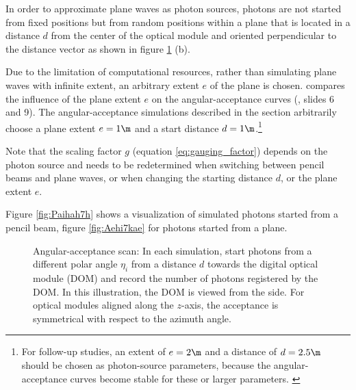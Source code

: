 In order to approximate plane waves as photon sources, photons are not started from fixed positions but from random positions within a plane that is located in a distance $d$ from the center of the optical module and oriented perpendicular to the distance vector as shown in figure \ref{fig:quie8Oof} (b).

Due to the limitation of computational resources, rather than simulating plane waves with infinite extent, an arbitrary extent $e$ of the plane is chosen. \rongen \cite{martindardupdate,rongenswedishcamera} compares the influence of the plane extent $e$ on the angular-acceptance curves (\cite{martindardupdate}, slides 6 and 9). The angular-acceptance simulations described in the section arbitrarily choose a plane extent $e = 1\m$ and a start distance $d = 1\m$.\footnote{For follow-up studies, an extent of $e=2\m$ and a distance of $d=2.5\m$ should be chosen as photon-source parameters, because the angular-acceptance curves become stable for these or larger parameters. \cite{rongenswedishcamera}}

Note that the scaling factor $g$ (equation \ref{eq:gauging_factor}) depends on the photon source and needs to be redetermined when switching between pencil beams and plane waves, or when changing the starting distance $d$, or the plane extent $e$.

Figure \ref{fig:Paihah7h} shows a \steamshovel visualization of simulated photons started from a pencil beam, figure \ref{fig:Aehi7kae} for photons started from a plane.


\begin{figure}[htbp]
  \hfill
  \caption{Angular-acceptance scan: In each simulation, start photons from a different polar angle $\eta_i$ from a distance $d$ towards the digital optical module (DOM) and record the number of photons registered by the DOM. In this illustration, the DOM is viewed from the side. For optical modules aligned along the $z$-axis, the acceptance is symmetrical with respect to the azimuth angle.}
  \label{fig:quie8Oof}
\end{figure}

